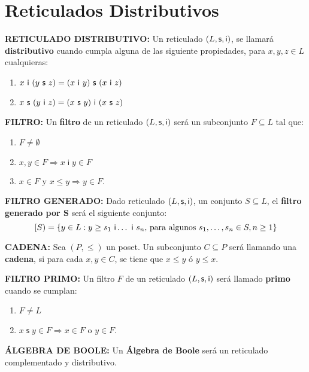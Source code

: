 \section{Reticulados Distributivos}

  \PN \textbf{RETICULADO DISTRIBUTIVO:} Un reticulado $(L, \mathsf{s}, \mathsf{i})$, se llamará \textbf{distributivo} cuando cumpla
  alguna de las siguiente propiedades, para $x, y, z \in L$ cualquieras:
  \begin{enumerate}
    \item $x \ \IN \ (y \ \SU \ z) = (x \ \IN \ y) \ \SU \ (x \ \IN \ z)$
    \item $x \ \SU \ (y \ \IN \ z) = (x \ \SU \ y) \ \IN \ (x \ \SU \ z)$
  \end{enumerate}

  \vspace{3mm}
  \PN \textbf{FILTRO:} Un \textbf{filtro} de un reticulado $(L,\mathsf{s},\mathsf{i})$ será un subconjunto
  $F \subseteq L$ tal que:
  \begin{enumerate}
    \item $F\neq \emptyset $
    \item $x,y\in F\Rightarrow x\;\mathsf{i\;}y\in F$
    \item $x\in F$ y $x\leq y\Rightarrow y\in F$.
  \end{enumerate}

  \vspace{3mm}
  \PN \textbf{FILTRO GENERADO:} Dado reticulado $(L, \mathsf{s}, \mathsf{i})$, un conjunto $S \subseteq L$, el \textbf{filtro generado
  por S} será el siguiente conjunto:
  \[
    [S) = \{y \in L: y \geq s_{1} \ \mathsf{i} \dotsc \ \mathsf{i} \ s_{n} \text{, para algunos } s_{1}, \dotsc, s_{n} \in S, n \geq
    1\}
  \]

  \vspace{3mm}
  \PN \textbf{CADENA:} Sea $(P, \leq)$ un poset. Un subconjunto $C \subseteq P$ será llamando una \textbf{cadena}, si
  para cada $x, y \in C$, se tiene que $x \leq y$ ó $y \leq x$.

  \vspace{3mm}
  \PN \textbf{FILTRO PRIMO:} Un filtro $F$ de un reticulado $(L,\mathsf{s},\mathsf{i})$ será llamado \textbf{primo}
  cuando se cumplan:
  \begin{enumerate}
    \item $F\neq L$
    \item $x\;\mathsf{s\;}y\in F\Rightarrow x\in F$ o $y\in F$.
  \end{enumerate}

  \vspace{3mm}
  \PN \textbf{ÁLGEBRA DE BOOLE:} Un \textbf{Álgebra de Boole} será un reticulado complementado y distributivo.
